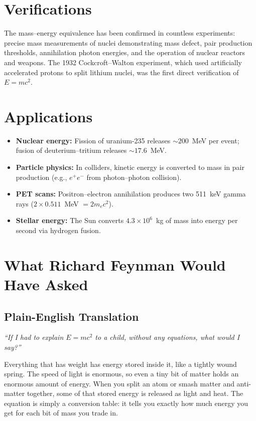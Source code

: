\section*{Verifications}

The mass--energy equivalence has been confirmed in countless experiments: precise mass measurements of nuclei demonstrating mass defect, pair production thresholds, annihilation photon energies, and the operation of nuclear reactors and weapons. The 1932 Cockcroft--Walton experiment, which used artificially accelerated protons to split lithium nuclei, was the first direct verification of $E = mc^{2}$.
\section*{Applications}

\begin{itemize}
  \item \textbf{Nuclear energy:} Fission of uranium-235 releases $\sim 200$~MeV per event; fusion of deuterium--tritium releases $\sim 17.6$~MeV.
  \item \textbf{Particle physics:} In colliders, kinetic energy is converted to mass in pair production (e.g., $e^{+}e^{-}$ from photon--photon collision).
  \item \textbf{PET scans:} Positron--electron annihilation produces two 511~keV gamma rays ($2 \times 0.511$~MeV $= 2m_{e}c^{2}$).
  \item \textbf{Stellar energy:} The Sun converts $4.3 \times 10^{6}$~kg of mass into energy per second via hydrogen fusion.
\end{itemize}
\section*{What Richard Feynman Would Have Asked}

\subsection*{Plain-English Translation}
\textit{``If I had to explain $E = mc^{2}$ to a child, without any equations, what would I say?''}

Everything that has weight has energy stored inside it, like a tightly wound spring. The speed of light is enormous, so even a tiny bit of matter holds an enormous amount of energy. When you split an atom or smash matter and anti-matter together, some of that stored energy is released as light and heat. The equation is simply a conversion table: it tells you exactly how much energy you get for each bit of mass you trade in.

